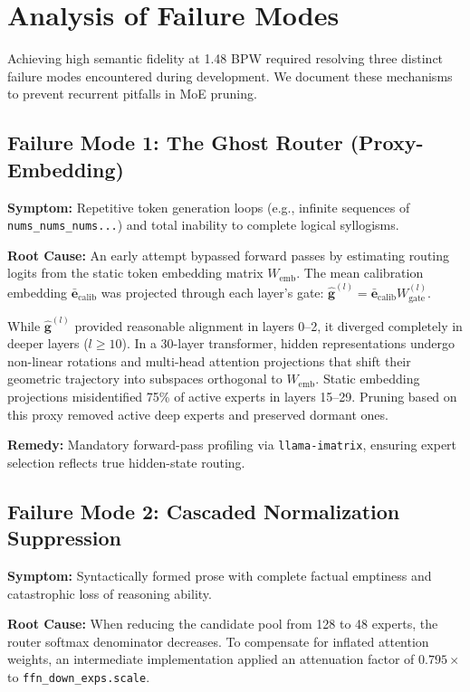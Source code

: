 \documentclass[conference]{IEEEtran}
\begin{document}
\section{Analysis of Failure Modes}

Achieving high semantic fidelity at 1.48 BPW required resolving three distinct failure modes encountered during development. We document these mechanisms to prevent recurrent pitfalls in MoE pruning.

\subsection{Failure Mode 1: The Ghost Router (Proxy-Embedding)}
\textbf{Symptom:} Repetitive token generation loops (e.g., infinite sequences of \texttt{nums\_nums\_nums...}) and total inability to complete logical syllogisms.

\textbf{Root Cause:} An early attempt bypassed forward passes by estimating routing logits from the static token embedding matrix $W_\text{emb}$. The mean calibration embedding $\bar{\mathbf{e}}_\text{calib}$ was projected through each layer's gate: $\hat{\mathbf{g}}^{(l)} = \bar{\mathbf{e}}_\text{calib} W_\text{gate}^{(l)}$.

While $\hat{\mathbf{g}}^{(l)}$ provided reasonable alignment in layers 0--2, it diverged completely in deeper layers ($l \ge 10$). In a 30-layer transformer, hidden representations undergo non-linear rotations and multi-head attention projections that shift their geometric trajectory into subspaces orthogonal to $W_\text{emb}$. Static embedding projections misidentified 75\% of active experts in layers 15--29. Pruning based on this proxy removed active deep experts and preserved dormant ones.

\textbf{Remedy:} Mandatory forward-pass profiling via \texttt{llama-imatrix}, ensuring expert selection reflects true hidden-state routing.

\subsection{Failure Mode 2: Cascaded Normalization Suppression}
\textbf{Symptom:} Syntactically formed prose with complete factual emptiness and catastrophic loss of reasoning ability.

\textbf{Root Cause:} When reducing the candidate pool from 128 to 48 experts, the router softmax denominator decreases. To compensate for inflated attention weights, an intermediate implementation applied an attenuation factor of $0.795\times$ to \texttt{ffn\_down\_exps.scale}.
\end{document}
